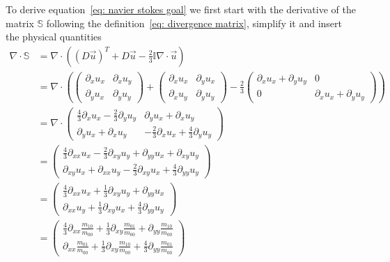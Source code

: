 To derive equation~\eqref{eq: navier stokes goal} we first start with the derivative of the matrix $\mathbb{S}$ following the definition~\eqref{eq: divergence matrix}, simplify it and insert the physical quantities
\begin{equation}
  \begin{aligned}
    \nabla \cdot \mathbb{S} &= \nabla \cdot \left({(D\vec{u})}^T + D\vec{u} - \frac{2}{3}\mathbb{I}\nabla\cdot\vec{u} \right)
    \\ &=
    \nabla \cdot \left(
    \begin{pmatrix}
      \partial_x u_x & \partial_x u_y \\
      \partial_y u_x & \partial_y u_y
    \end{pmatrix}
    +
    \begin{pmatrix}
      \partial_x u_x & \partial_y u_x \\
      \partial_x u_y & \partial_y u_y
    \end{pmatrix}
    -\frac{2}{3}
    \begin{pmatrix}
      \partial_x u_x + \partial_y u_y &  0\\
      0 & \partial_x u_x + \partial_y u_y
    \end{pmatrix}
    \right)
    \\ &=
    \nabla \cdot
    \begin{pmatrix}
      \frac{4}{3}\partial_x u_x - \frac{2}{3}\partial_y u_y & \partial_y u_x + \partial_x u_y \\
      \partial_y u_x + \partial_x u_y & -\frac{2}{3}\partial_x u_x + \frac{4}{3}\partial_y u_y
    \end{pmatrix}
    \\ &=
    \begin{pmatrix}
      \frac{4}{3}\partial_{xx} u_x - \frac{2}{3}\partial_{xy} u_y + \partial_{yy} u_x + \partial_{xy} u_y \\
      \partial_{xy} u_x + \partial_{xx} u_y -\frac{2}{3}\partial_{xy} u_x + \frac{4}{3}\partial_{yy} u_y
    \end{pmatrix}
    \\ &=
    \begin{pmatrix}
      \frac{4}{3}\partial_{xx} u_x + \frac{1}{3}\partial_{xy} u_y + \partial_{yy} u_x \\
      \partial_{xx} u_y +\frac{1}{3}\partial_{xy} u_x + \frac{4}{3}\partial_{yy} u_y
    \end{pmatrix}
    \\ &=
    \begin{pmatrix}
      \frac{4}{3}\partial_{xx} \frac{m_{10}}{m_{00}} + \frac{1}{3}\partial_{xy} \frac{m_{01}}{m_{00}} + \partial_{yy} \frac{m_{10}}{m_{00}} \\
      \partial_{xx} \frac{m_{01}}{m_{00}} +\frac{1}{3}\partial_{xy} \frac{m_{10}}{m_{00}} + \frac{4}{3}\partial_{yy} \frac{m_{01}}{m_{00}}
    \end{pmatrix}
  \end{aligned}
\end{equation}

